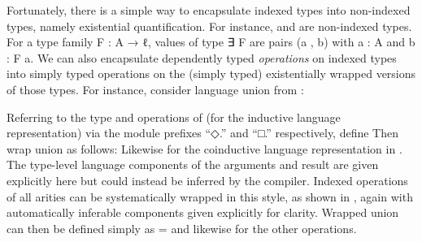 \documentclass[acmsmall,screen,timestamp]{acmart}  %
\begin{document}
Fortunately, there is a simple way to encapsulate indexed types into non-indexed types, namely existential quantification.
For instance, { } and { } are non-indexed types.
For a type family {\AB F \AK : \AB A \AK →  \AB ℓ}, values of type {\AF ∃ \AB F} are pairs {(\AB a , \AB b)} with {\AB a \AK : \AB A} and {\AB b \AK : \AB F \AB a}.
We can also encapsulate dependently typed \emph{operations} on indexed types into simply typed operations on the (simply typed) existentially wrapped versions of those types.
For instance, consider language union from :
\begin{code}
\>[2]%
\>[7]\AgdaSymbol{:}\AgdaSpace{}%
%
\>[15]%
\>[18]\AgdaSpace{}%
\AgdaSpace{}%
%
\>[28]\AgdaSpace{}%
\AgdaSpace{}%
\AgdaSymbol{(}%
\>[39]%
\>[44]\AgdaSymbol{)}\<%
\end{code}
Referring to the type and operations of  (for the inductive language representation) via the module prefixes ``{◇.}\hspace{0.05em}'' and ``{□.}\hspace{0.05em}'' respectively, define 
Then wrap union as follows:
Likewise for the coinductive language representation in .
The type-level language components of the arguments and result are given explicitly here but could instead be inferred by the compiler.
\rnc{}
Indexed operations of all arities can be systematically wrapped in this style, as shown in
, again with automatically inferable components given explicitly for clarity.
Wrapped union can then be defined simply as { \AS =  } and likewise for the other operations.
\end{document}
